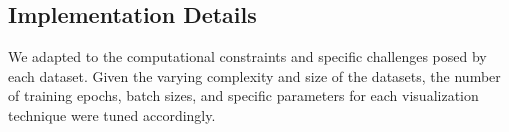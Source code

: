 \subsection{Implementation Details}
We adapted to the computational constraints and specific challenges posed by each dataset. Given the varying complexity and size of the datasets, the number of training epochs, batch sizes, and specific parameters for each visualization technique were tuned accordingly.
